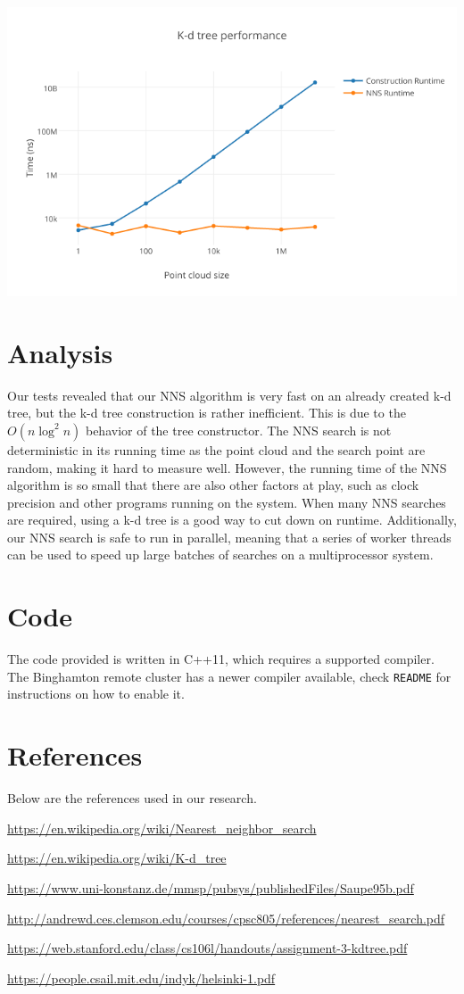 \documentclass[a4paper,12pt]{article}
\def\code#1{\texttt{#1}}
\begin{document}
\includegraphics[width=15cm]{results.png}

\section{Analysis}
Our tests revealed that our NNS algorithm is very fast on an already created k-d tree, but
the k-d tree construction is rather inefficient.
This is due to the $O(n \log^2 n)$ behavior of the tree constructor.
The NNS search is not deterministic in its running time as the point cloud and the search
point are random, making it hard to measure well.
However, the running time of the NNS algorithm is so small that there are also other factors
at play, such as clock precision and other programs running on the system.
When many NNS searches are required, using a k-d tree is a good way to cut down on runtime.
Additionally, our NNS search is safe to run in parallel, meaning that a series of worker
threads can be used to speed up large batches of searches on a multiprocessor system.

\section{Code}
The code provided is written in C++11, which requires a supported compiler.
The Binghamton remote cluster has a newer compiler available, check \code{README}
for instructions on how to enable it.

\section{References}
Below are the references used in our research.

\url{https://en.wikipedia.org/wiki/Nearest_neighbor_search}

\url{https://en.wikipedia.org/wiki/K-d_tree}

\url{https://www.uni-konstanz.de/mmsp/pubsys/publishedFiles/Saupe95b.pdf}

\url{http://andrewd.ces.clemson.edu/courses/cpsc805/references/nearest_search.pdf}

\url{https://web.stanford.edu/class/cs106l/handouts/assignment-3-kdtree.pdf}

\url{https://people.csail.mit.edu/indyk/helsinki-1.pdf}
\end{document}
